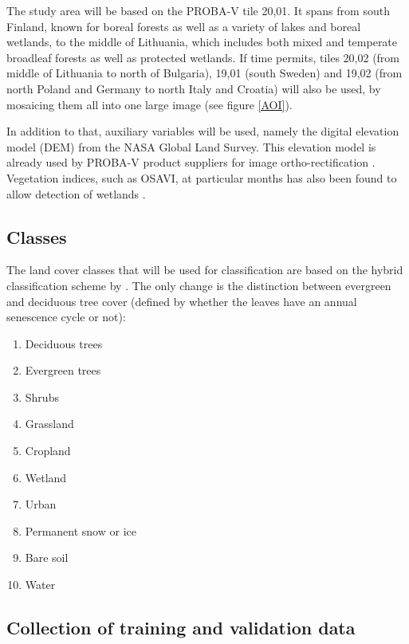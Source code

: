 \documentclass[a4paper,10pt]{article}
\begin{document}
The study area will be based on the PROBA-V tile 20,01. It spans from south Finland, known for boreal forests as well as a variety of lakes and boreal wetlands, to the middle of Lithuania, which includes both mixed and temperate broadleaf forests as well as protected wetlands. If time permits, tiles 20,02 (from middle of Lithuania to north of Bulgaria), 19,01 (south Sweden) and 19,02 (from north Poland and Germany to north Italy and Croatia) will also be used, by mosaicing them all into one large image (see figure \ref{AOI}).

In addition to that, auxiliary variables will be used, namely the digital elevation model (DEM) from the NASA Global Land Survey. This elevation model is already used by PROBA-V product suppliers for image ortho-rectification \citep{probavguide}. Vegetation indices, such as OSAVI, at particular months has also been found to allow detection of wetlands \citep{davranche2010wetland}.

\subsection{Classes}

The land cover classes that will be used for classification are based on the hybrid classification scheme by \citep{see2015hybrid}. The only change is the distinction between evergreen and deciduous tree cover (defined by whether the leaves have an annual senescence cycle or not):
\begin{enumerate}
 \item Deciduous trees
 \item Evergreen trees
 \item Shrubs
 \item Grassland
 \item Cropland
 \item Wetland
 \item Urban
 \item Permanent snow or ice
 \item Bare soil
 \item Water
\end{enumerate}

\subsection{Collection of training and validation data}
\end{document}
